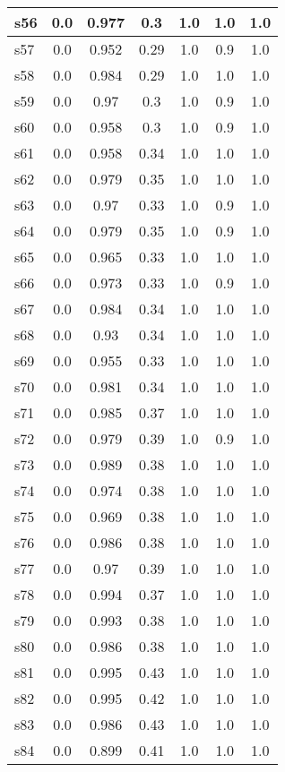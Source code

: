 \documentclass{article}
\begin{document}
\begin{tabular}{|l|c|c|c|c|c|c|}
\hline
s56 &0.0 & 0.977 & 0.3 & 1.0 & 1.0 & 1.0\\
\hline
s57 &0.0 & 0.952 & 0.29 & 1.0 & 0.9 & 1.0\\
\hline
s58 &0.0 & 0.984 & 0.29 & 1.0 & 1.0 & 1.0\\
\hline
s59 &0.0 & 0.97 & 0.3 & 1.0 & 0.9 & 1.0\\
\hline
s60 &0.0 & 0.958 & 0.3 & 1.0 & 0.9 & 1.0\\
\hline
s61 &0.0 & 0.958 & 0.34 & 1.0 & 1.0 & 1.0\\
\hline
s62 &0.0 & 0.979 & 0.35 & 1.0 & 1.0 & 1.0\\
\hline
s63 &0.0 & 0.97 & 0.33 & 1.0 & 0.9 & 1.0\\
\hline
s64 &0.0 & 0.979 & 0.35 & 1.0 & 0.9 & 1.0\\
\hline
s65 &0.0 & 0.965 & 0.33 & 1.0 & 1.0 & 1.0\\
\hline
s66 &0.0 & 0.973 & 0.33 & 1.0 & 0.9 & 1.0\\
\hline
s67 &0.0 & 0.984 & 0.34 & 1.0 & 1.0 & 1.0\\
\hline
s68 &0.0 & 0.93 & 0.34 & 1.0 & 1.0 & 1.0\\
\hline
s69 &0.0 & 0.955 & 0.33 & 1.0 & 1.0 & 1.0\\
\hline
s70 &0.0 & 0.981 & 0.34 & 1.0 & 1.0 & 1.0\\
\hline
s71 &0.0 & 0.985 & 0.37 & 1.0 & 1.0 & 1.0\\
\hline
s72 &0.0 & 0.979 & 0.39 & 1.0 & 0.9 & 1.0\\
\hline
s73 &0.0 & 0.989 & 0.38 & 1.0 & 1.0 & 1.0\\
\hline
s74 &0.0 & 0.974 & 0.38 & 1.0 & 1.0 & 1.0\\
\hline
s75 &0.0 & 0.969 & 0.38 & 1.0 & 1.0 & 1.0\\
\hline
s76 &0.0 & 0.986 & 0.38 & 1.0 & 1.0 & 1.0\\
\hline
s77 &0.0 & 0.97 & 0.39 & 1.0 & 1.0 & 1.0\\
\hline
s78 &0.0 & 0.994 & 0.37 & 1.0 & 1.0 & 1.0\\
\hline
s79 &0.0 & 0.993 & 0.38 & 1.0 & 1.0 & 1.0\\
\hline
s80 &0.0 & 0.986 & 0.38 & 1.0 & 1.0 & 1.0\\
\hline
s81 &0.0 & 0.995 & 0.43 & 1.0 & 1.0 & 1.0\\
\hline
s82 &0.0 & 0.995 & 0.42 & 1.0 & 1.0 & 1.0\\
\hline
s83 &0.0 & 0.986 & 0.43 & 1.0 & 1.0 & 1.0\\
\hline
s84 &0.0 & 0.899 & 0.41 & 1.0 & 1.0 & 1.0\\

\end{tabular}
\end{document}
